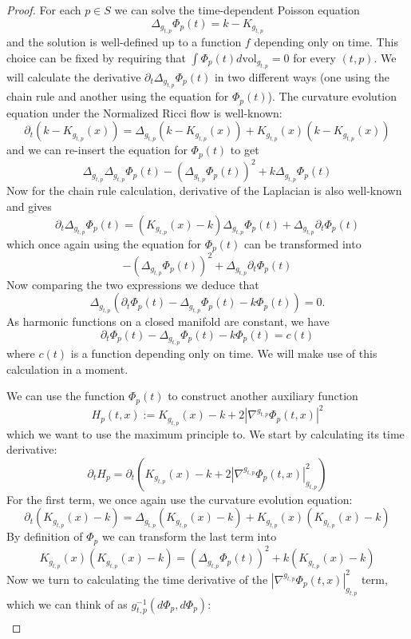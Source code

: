 \documentclass[10pt,a4paper]{amsart}
\begin{document}
\begin{proof}
    For each $p\in S$ we can solve the time-dependent Poisson equation 
    $$\Delta_{g_{t,p}} \Phi_p(t) = k-K_{g_{t,p}}$$
    and the solution is well-defined up to a function $f$ depending only on time. This choice can be fixed by requiring that $\int \Phi_p(t) d\text{vol}_{g_{t,p}} = 0$ for every $(t,p)$. We will calculate the derivative $\partial_t \Delta_{g_{t,p}} \Phi_p(t)$ in two different ways (one using the chain rule and another using the equation for $\Phi_p(t)$). The curvature evolution equation under the Normalized Ricci flow is well-known\thinspace:
    $$\partial_t (k-K_{g_{t,p}}(x))=\Delta_{g_{t,p}}(k-K_{g_{t,p}}(x))+K_{g_{t,p}}(x)(k-K_{g_{t,p}}(x))$$
    and we can re-insert the equation for $\Phi_p(t)$ to get
    $$\Delta_{g_{t,p}}\Delta_{g_{t,p}}\Phi_p(t)-(\Delta_{g_{t,p}}\Phi_p(t))^2+k\Delta_{g_{t,p}}\Phi_p(t)$$
    Now for the chain rule calculation, derivative of the Laplacian is also well-known and gives
    $$\partial_t \Delta_{g_{t,p}} \Phi_p(t)=(K_{g_{t,p}}(x)-k)\Delta_{g_{t,p}}\Phi_p(t)+\Delta_{g_{t,p}}\partial_t\Phi_p(t)$$
    which once again using the equation for $\Phi_p(t)$ can be transformed into
    $$-(\Delta_{g_{t,p}}\Phi_p(t))^2+\Delta_{g_{t,p}}\partial_t\Phi_p(t)$$
    Now comparing the two expressions we deduce that 
    $$\Delta_{g_{t,p}}(\partial_t\Phi_p(t)-\Delta_{g_{t,p}}\Phi_p(t)-k\Phi_p(t))=0.$$
    As harmonic functions on a closed manifold are constant, we have 
    $$\partial_t\Phi_p(t)-\Delta_{g_{t,p}}\Phi_p(t)-k\Phi_p(t)=c(t)$$
    where $c(t)$ is a function depending only on time. We will make use of this calculation in a moment. \par 
    We can use the function $\Phi_p(t)$ to construct another auxiliary function 
    $$H_p(t,x):= K_{g_{t,p}}(x)-k + 2|\nabla^{g_{t,p}}\Phi_p(t,x)|^2$$
    which we want to use the maximum principle to. We start by calculating its time derivative\thinspace:
    $$
        \partial_t H_p= \partial_t(K_{g_{t,p}}(x)-k + 2|\nabla^{g_{t,p}}\Phi_p(t,x)|_{g_{t,p}}^2)
    $$
    For the first term, we once again use the curvature evolution equation:
    $$\partial_t (K_{g_{t,p}}(x)-k)=\Delta_{g_{t,p}}(K_{g_{t,p}}(x)-k)+K_{g_{t,p}}(x)(K_{g_{t,p}}(x)-k)$$
    By definition of $\Phi_p$ we can transform the last term into 
    $$K_{g_{t,p}}(x)(K_{g_{t,p}}(x)-k) = (\Delta_{g_{t,p}} \Phi_p(t))^2+k(K_{g_{t,p}}(x)-k)$$
    Now we turn to calculating the time derivative of the $|\nabla^{g_{t,p}}\Phi_p(t,x)|_{g_{t,p}}^2$ term, which we can think of as $g^{-1}_{t,p}(d\Phi_p, d\Phi_p)$\thinspace:
    \begin{multline*}

\end{multline*}
\end{proof}
\end{document}
